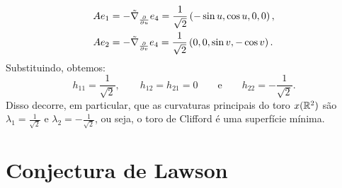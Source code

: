\documentclass[12pt,a4paper]{beamer}
\theoremstyle{definition}
\begin{document}
\begin{frame}[allowframebreaks]
	\begin{align*}
	A e_1 &= -\tilde{\nabla}_{\frac{\partial}{\partial u}} e_4 = \frac{1}{\sqrt{2}} \left( -\sin u, \cos u, 0, 0 \right),\\
	A e_2 &= -\tilde{\nabla}_{\frac{\partial}{\partial v}} e_4 = \frac{1}{\sqrt{2}} \left( 0,0, \sin v, -\cos v \right).
	\end{align*}
	Substituindo, obtemos:
	\[ h_{11} = \frac{1}{\sqrt{2}}, \qquad h_{12}=h_{21}=0 \qquad \text{e} \qquad h_{22} = -\frac{1}{\sqrt{2}}. \]
	Disso decorre, em particular, que as curvaturas principais do toro $x(\mathbb R^2)$ são $\lambda_1 = \frac{1}{\sqrt{2}}$ e $\lambda_2 = -\frac{1}{\sqrt{2}}$, ou seja, o toro de Clifford é uma superfície mínima.
\end{frame}


\section{Conjectura de Lawson}
\end{document}
